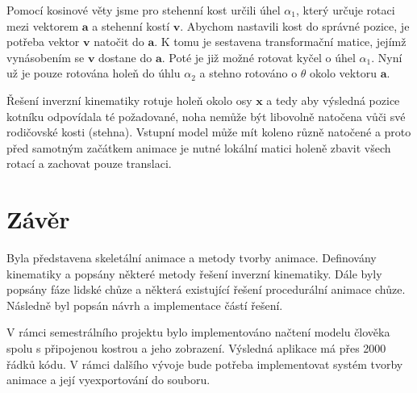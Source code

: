 Pomocí kosinové věty jsme pro stehenní kost určili úhel $\alpha_1$, který určuje rotaci mezi vektorem $\mathbf{a}$ a stehenní kostí $\mathbf{v}$. Abychom nastavili kost do správné pozice, je potřeba vektor $\mathbf{v}$ natočit do $\mathbf{a}$. K tomu je sestavena transformační matice, jejímž vynásobením se $\mathbf{v}$ dostane do $\mathbf{a}$. Poté je již možné rotovat kyčel o úhel $\alpha_1$. Nyní už je pouze rotována holeň do úhlu $\alpha_2$ a stehno rotováno o $\theta$ okolo vektoru $\mathbf{a}$.

Řešení inverzní kinematiky rotuje holeň okolo osy $\mathbf{x}$ a tedy aby  výsledná pozice kotníku odpovídala té požadované, noha nemůže být libovolně natočena vůči své rodičovské kosti (stehna). Vstupní model může mít koleno různě natočené a proto před samotným začátkem animace je nutné lokální matici holeně zbavit všech rotací a zachovat pouze translaci.


\chapter{Závěr}
Byla představena skeletální animace a metody tvorby animace. Definovány kinematiky a popsány některé metody řešení inverzní kinematiky. Dále byly popsány fáze lidské chůze a některá existující řešení procedurální animace chůze. Následně byl popsán návrh a implementace částí řešení. 

V rámci semestrálního projektu  bylo implementováno načtení modelu člověka spolu s připojenou kostrou a jeho zobrazení. Výsledná aplikace má přes 2000 řádků kódu. V rámci dalšího vývoje bude potřeba implementovat systém tvorby animace a její vyexportování do souboru.



